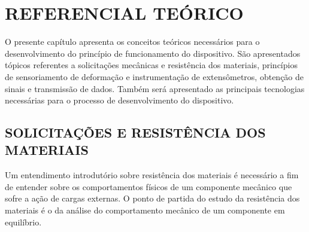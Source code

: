 



\chapter{REFERENCIAL TEÓRICO}\label{cap:REFERENCIAL TEÓRICO}

O presente capítulo apresenta os conceitos teóricos necessários para o desenvolvimento do princípio de funcionamento do dispositivo. São apresentados tópicos referentes a solicitações mecânicas e resistência dos materiais, princípios de sensoriamento de deformação e instrumentação de extensômetros, obtenção de sinais e transmissão de dados. Também será apresentado as principais tecnologias necessárias para o processo de desenvolvimento do dispositivo.

\section{SOLICITAÇÕES E RESISTÊNCIA DOS MATERIAIS}

Um entendimento introdutório sobre resistência dos materiais é necessário a fim de entender sobre os comportamentos físicos de um componente mecânico que sofre a ação de cargas externas. O ponto de partida do estudo da resistência dos materiais é o da análise do comportamento mecânico de um componente em equilíbrio.


